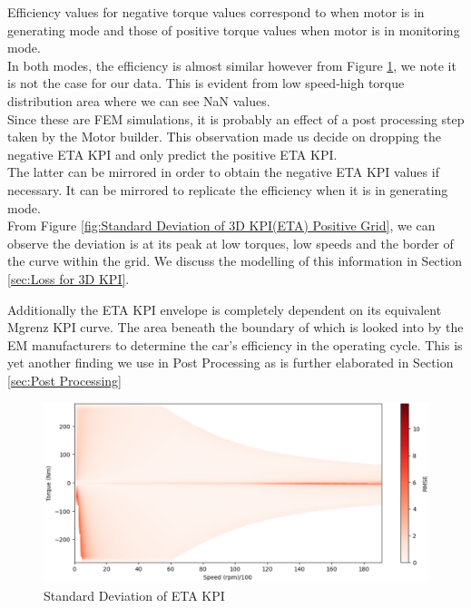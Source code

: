 \documentclass{report} %
\begin{document}
Efficiency values for negative torque values correspond to when motor is in generating mode and those of positive torque values when motor is in monitoring mode.\\
In both modes, the efficiency is almost similar however from Figure \ref{fig:Standard Deviation of 3D KPI(ETA)}, we note it is not the case for our data. 
This is evident from low speed-high torque distribution area where we can see \ac{NaN} values.\\
Since these are FEM simulations, it is probably an effect of a post processing step taken by the Motor builder.
This observation made us decide on dropping the negative ETA \ac{KPI} and only predict the positive ETA \ac{KPI}.\\
The latter can be mirrored in order to obtain the negative ETA \ac{KPI} values if necessary.
It can be mirrored to replicate the efficiency when it is in generating mode.\\

From Figure \ref{fig:Standard Deviation of 3D KPI(ETA) Positive Grid}, we can observe the deviation is at its peak at low torques, low speeds and the border of the curve within the grid.
We discuss the modelling of this information in Section \ref{sec:Loss for 3D KPI}.

Additionally the ETA \ac{KPI} envelope is completely dependent on its equivalent Mgrenz \ac{KPI} curve. 
The area beneath the boundary of which is looked into by the \ac{EM} manufacturers to determine the car's efficiency in the operating cycle.
This is yet another finding we use in Post Processing as is further elaborated in Section \ref{sec:Post Processing}

\begin{figure}[H]
    \centering
    \includegraphics[width=1\textwidth]{./ReportImages/stddev_y2.png} 
    \caption{Standard Deviation of ETA \ac{KPI}} 
    \label{fig:Standard Deviation of 3D KPI(ETA)}
\end{figure}
\end{document}
